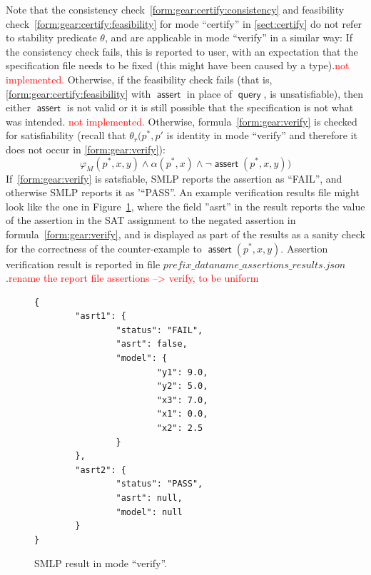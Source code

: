\documentclass[a4paper,parskip=half]{article} %
\newcommand*\query{\operatorname{\mathsf{query}}}
\newcommand*\assert{\operatorname{\mathsf{assert}}}
\newcommand\todozk[1]{\textcolor{red}{#1}}
\newcommand*\ZK{\todozk}
\begin{document}
Note that the consistency check~\cref{form:gear:certify:consistency} and feasibility check~\cref{form:gear:certify:feasibility} 
for mode ``certify'' in \cref{sect:certify} do not refer to stability predicate $\theta$, and are applicable in mode ``verify'' in a similar way:
If the consistency check fails, this is reported to user, with an expectation that the specification file needs to be fixed 
(this might have been caused by a type).\ZK{not implemented.}  Otherwise, if the feasibility check fails 
(that is, \cref{form:gear:certify:feasibility} with $\assert$ in place of $\query$, is unsatisfiable), then either $\assert$ is not valid 
or it is still possible that the specification is not what was intended. \ZK{not implemented.} 
Otherwise,  formula~\cref{form:gear:verify} is checked for satisfiability 
(recall that $\theta_r(p^*, p'$ is identity in mode ``verify'' and therefore it does not occur in \cref{form:gear:verify}): 
\begin{equation}\label{form:gear:verify}
       \varphi_M(p^*,x,y)  \wedge  \alpha(p^*,x) \wedge  \neg  \assert(p^*,x,y))
\end{equation}
If~\cref{form:gear:verify} is satsfiable, SMLP reports the assertion as ``FAIL'',  and otherwise SMLP reports it as '``PASS''. 
An example verification results file might look like the one in Figure~\cref{fig:verify:result},  where the field ''asrt'' in the result reports 
the value of the assertion in the SAT assignment to the negated assertion in formula~\cref{form:gear:verify}, and is displayed 
as part of the results as a sanity check for the correctness of the counter-example to $\assert(p^*,x,y)$. 
Assertion verification result is reported in file $prefix\_dataname\_assertions\_results.json$.\ZK{rename the report file assertions --> verify, to be uniform}


\begin{figure}
\small
\begin{verbatim}
{
        "asrt1": {
                "status": "FAIL",
                "asrt": false,
                "model": {
                        "y1": 9.0,
                        "y2": 5.0,
                        "x3": 7.0,
                        "x1": 0.0,
                        "x2": 2.5
                }
        },
        "asrt2": {
                "status": "PASS",
                "asrt": null,
                "model": null
        }
}

\end{verbatim}
\caption{SMLP result in mode ``verify''.}\label{fig:verify:result}
\end{figure}
\end{document}

